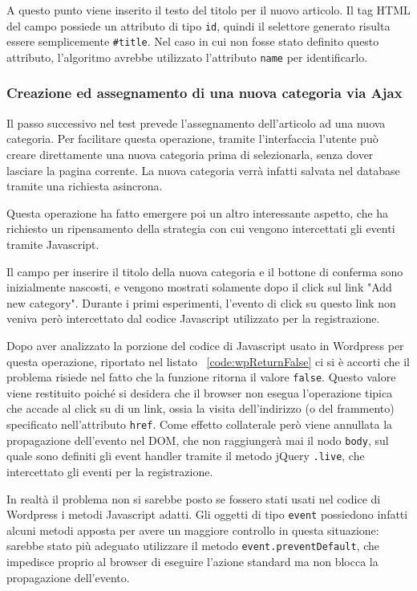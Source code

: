 A questo punto viene inserito il testo del titolo per il nuovo articolo. Il tag HTML del campo possiede un attributo di tipo \verb|id|, quindi il selettore generato risulta essere semplicemente \verb|#title|. Nel caso in cui non fosse stato definito questo attributo, l'algoritmo avrebbe utilizzato l'attributo \verb|name| per identificarlo.

\subsubsection{Creazione ed assegnamento di una nuova categoria via Ajax}

Il passo successivo nel test prevede l'assegnamento dell'articolo ad una nuova categoria. Per facilitare questa operazione, tramite l'interfaccia l'utente può creare direttamente una nuova categoria prima di selezionarla, senza dover lasciare la pagina corrente. La nuova categoria verrà infatti salvata nel database tramite una richiesta asincrona.

Questa operazione ha fatto emergere poi un altro interessante aspetto, che ha richiesto un ripensamento della strategia con cui vengono intercettati gli eventi tramite Javascript.

Il campo per inserire il titolo della nuova categoria e il bottone di conferma sono inizialmente nascosti, e vengono mostrati solamente dopo il click sul link "Add new category". Durante i primi esperimenti, l'evento di click su questo link non veniva però intercettato dal codice Javascript utilizzato per la registrazione.

Dopo aver analizzato la porzione del codice di Javascript usato in Wordpress per questa operazione, riportato nel listato ~\ref{code:wpReturnFalse} ci si è accorti che il problema risiede nel fatto che la funzione ritorna il valore \verb|false|.
Questo valore viene restituito poiché si desidera che il browser non esegua l'operazione tipica che accade al click su di un link, ossia la visita dell'indirizzo (o del frammento) specificato nell'attributo \verb|href|. Come effetto collaterale però viene annullata la propagazione dell'evento nel DOM, che non raggiungerà mai il nodo \verb|body|, sul quale sono definiti gli event handler tramite il metodo jQuery \verb|.live|, che intercettato gli eventi per la registrazione.

In realtà il problema non si sarebbe posto se fossero stati usati nel codice di Wordpress i metodi Javascript adatti. Gli oggetti di tipo \verb|event| possiedono infatti alcuni metodi apposta per avere un maggiore controllo in questa situazione: sarebbe stato più adeguato utilizzare il metodo \verb|event.preventDefault|, che impedisce proprio al browser di eseguire l'azione standard ma non blocca la propagazione dell'evento.

